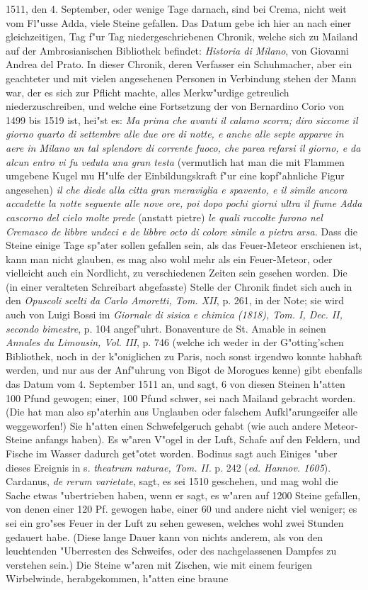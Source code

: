 \documentclass[a4paper, 11pt, oneside, polutonikogreek, german]{article}
\begin{document}
1511, den 4. September, oder wenige Tage darnach, sind bei Crema, nicht weit vom Fl"usse Adda, viele Steine gefallen. Das Datum gebe ich hier an nach einer gleichzeitigen, Tag f"ur Tag niedergeschriebenen Chronik, welche sich zu Mailand auf der Ambrosianischen Bibliothek befindet: \emph{Historia di Milano}, von Giovanni Andrea del Prato. In dieser Chronik, deren Verfasser ein Schuhmacher, aber ein geachteter und mit vielen angesehenen Personen in Verbindung stehen der Mann war, der es sich zur Pflicht machte, alles Merkw"urdige getreulich niederzuschreiben, und welche eine Fortsetzung der von Bernardino Corio von 1499 bis 1519 ist, hei"st es: \emph{Ma prima che avanti il calamo scorra; diro siccome il giorno quarto di settembre alle due ore di notte, e anche alle septe apparve in aere in Milano un tal splendore di corrente fuoco, che parea refarsi il giorno, e da alcun entro vi fu veduta una gran testa} (vermutlich hat man die mit Flammen umgebene Kugel mu H"ulfe der Einbildungskraft f"ur eine kopf"ahnliche Figur angesehen) \emph{il che diede alla citta gran meraviglia e spavento, e il simile ancora accadette la notte seguente alle nove ore, poi dopo pochi giorni ultra il fiume Adda cascorno del cielo molte prede} (anstatt pietre) \emph{le quali raccolte furono nel Cremasco de libbre undeci e de libbre octo di colore simile a pietra arsa.} Dass die Steine einige Tage sp"ater sollen gefallen sein, als das Feuer-Meteor erschienen ist, kann man nicht glauben, es mag also wohl mehr als ein Feuer-Meteor, oder vielleicht auch ein Nordlicht, zu verschiedenen Zeiten sein gesehen worden. Die (in einer veralteten Schreibart abgefasste) Stelle der Chronik findet sich auch in den \emph{Opuscoli scelti da Carlo Amoretti, Tom. XII}, p. 261, in der Note; sie wird auch von Luigi Bossi im \emph{Giornale di sisica e chimica (1818), Tom. I, Dec. II, secondo bimestre}, p. 104 angef"uhrt. Bonaventure de St. Amable in seinen \emph{Annales du Limousin, Vol. III}, p. 746 (welche ich weder in der G"otting'schen Bibliothek, noch in der k"oniglichen zu Paris, noch sonst irgendwo konnte habhaft werden, und nur aus der Anf"uhrung von Bigot de Morogues kenne) gibt ebenfalls das Datum vom 4. September 1511 an, und sagt, 6 von diesen Steinen h"atten 100 Pfund gewogen; einer, 100 Pfund schwer, sei nach Mailand gebracht worden. (Die hat man also sp"aterhin aus Unglauben oder falschem Aufkl"arungseifer alle weggeworfen!) Sie h"atten einen Schwefelgeruch gehabt (wie auch andere Meteor-Steine anfangs haben). Es w"aren V"ogel in der Luft, Schafe auf den Feldern, und Fische im Wasser dadurch get"otet worden. Bodinus sagt auch Einiges "uber dieses Ereignis in s. \emph{theatrum naturae, Tom. II.} p. 242 (\emph{ed. Hannov. 1605}). Cardanus, \emph{de rerum varietate}, sagt, es sei 1510 geschehen, und mag wohl die Sache etwas "ubertrieben haben, wenn er sagt, es w"aren auf 1200 Steine gefallen, von denen einer 120 Pf. gewogen habe, einer 60 und andere nicht viel weniger; es sei ein gro"ses Feuer in der Luft zu sehen gewesen, welches wohl zwei Stunden gedauert habe. (Diese lange Dauer kann von nichts anderem, als von den leuchtenden "Uberresten des Schweifes, oder des nachgelassenen Dampfes zu verstehen sein.) Die Steine w"aren mit Zischen, wie mit einem feurigen Wirbelwinde, herabgekommen, h"atten eine braune 
\end{document}
